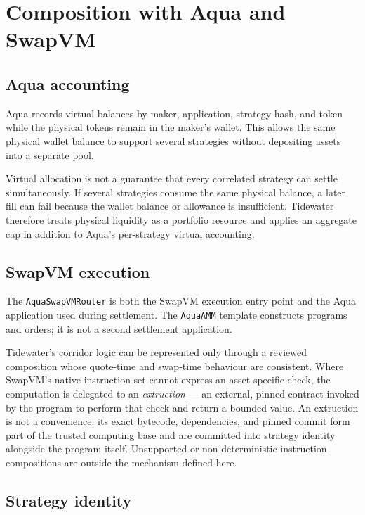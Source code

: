 \documentclass[10pt,twocolumn]{article}
\theoremstyle{definition}
\begin{document}
\section{Composition with Aqua and SwapVM}

\subsection{Aqua accounting}

Aqua records virtual balances by maker, application, strategy hash, and token while the physical tokens remain in
the maker's wallet. This allows the same physical wallet balance to support several strategies without depositing
assets into a separate pool.

Virtual allocation is not a guarantee that every correlated strategy can settle simultaneously. If several
strategies consume the same physical balance, a later fill can fail because the wallet balance or allowance is
insufficient. Tidewater therefore treats physical liquidity as a portfolio resource and applies an aggregate cap
in addition to Aqua's per-strategy virtual accounting.

\subsection{SwapVM execution}

The \texttt{AquaSwapVMRouter} is both the SwapVM execution entry point and the Aqua application used during
settlement. The \texttt{AquaAMM} template constructs programs and orders; it is not a second settlement
application.

Tidewater's corridor logic can be represented only through a reviewed composition whose quote-time and swap-time
behaviour are consistent. Where SwapVM's native instruction set cannot express an asset-specific check, the
computation is delegated to an \emph{extruction} --- an external, pinned contract invoked by the program to
perform that check and return a bounded value. An extruction is not a convenience: its exact bytecode,
dependencies, and pinned commit form part of the trusted computing base and are committed into strategy identity
alongside the program itself. Unsupported or non-deterministic instruction compositions are outside the mechanism
defined here.

\subsection{Strategy identity}
\end{document}
